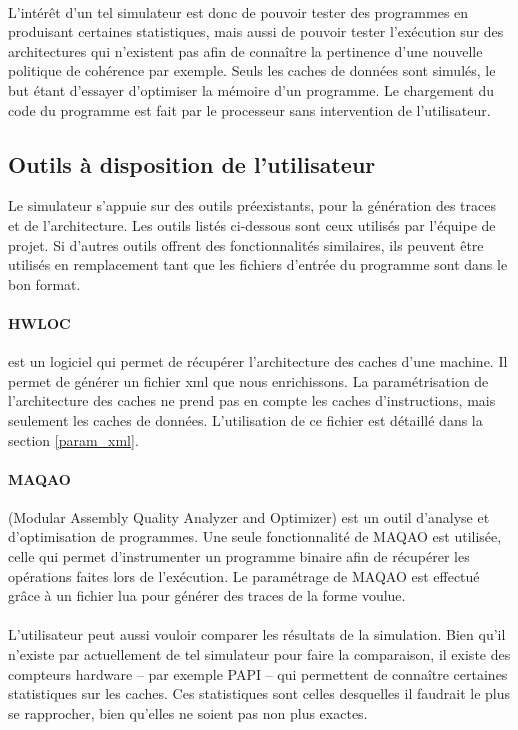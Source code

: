 \paragraph{}
L'intérêt d'un tel simulateur est donc de pouvoir tester des programmes en produisant certaines statistiques, mais aussi de pouvoir tester l'exécution sur des architectures qui n'existent pas afin de connaître la pertinence d'une nouvelle politique de cohérence par exemple. Seuls les caches de données sont simulés, le but étant d'essayer d'optimiser la mémoire d'un programme. Le chargement du code du programme est fait par le processeur sans intervention de l'utilisateur.

\subsection{Outils à disposition de l'utilisateur}

Le simulateur s'appuie sur des outils préexistants, pour la génération des traces et de l'architecture. Les outils listés ci-dessous sont ceux utilisés par l'équipe de projet. Si d'autres outils offrent des fonctionnalités similaires, ils peuvent être utilisés en remplacement tant que les fichiers d'entrée du programme sont dans le bon format.

\paragraph{HWLOC} est un logiciel qui permet de récupérer l'architecture des caches d'une machine. Il permet de générer un fichier xml que nous enrichissons. La paramétrisation de l'architecture des caches ne prend pas en compte les caches d'instructions, mais seulement les caches de données. L'utilisation de ce fichier est détaillé dans la section \ref{param_xml}.

\paragraph{MAQAO} (Modular Assembly Quality Analyzer and Optimizer) est un outil d'analyse et d'optimisation de programmes. Une seule fonctionnalité de \textsf{MAQAO} est utilisée, celle qui permet d'instrumenter un programme binaire afin de récupérer les opérations faites lors de l'exécution. Le paramétrage de \textsf{MAQAO} est effectué grâce à un fichier lua pour générer des traces de la forme voulue.

\paragraph{}
L'utilisateur peut aussi vouloir comparer les résultats de la simulation. Bien qu'il n'existe par actuellement de tel simulateur pour faire la comparaison, il existe des compteurs hardware -- par exemple \textsf{PAPI} -- qui permettent de connaître certaines statistiques sur les caches. Ces statistiques sont celles desquelles il faudrait le plus se rapprocher, bien qu'elles ne soient pas non plus exactes.

